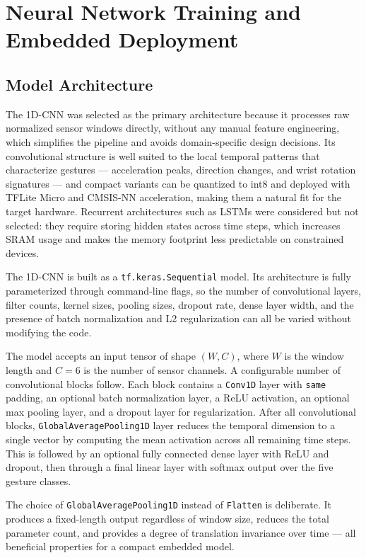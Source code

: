 \section{Neural Network Training and Embedded Deployment}
\label{sec:nn_training}

\subsection{Model Architecture}
\label{sec:architecture}

The 1D-CNN was selected as the primary architecture because it processes raw normalized sensor windows directly, without any manual feature engineering, which simplifies the pipeline and avoids domain-specific design decisions. Its convolutional structure is well suited to the local temporal patterns that characterize gestures — acceleration peaks, direction changes, and wrist rotation signatures — and compact variants can be quantized to int8 and deployed with TFLite Micro and CMSIS-NN acceleration, making them a natural fit for the target hardware. Recurrent architectures such as LSTMs were considered but not selected: they require storing hidden states across time steps, which increases SRAM usage and makes the memory footprint less predictable on constrained devices.

The 1D-CNN is built as a \texttt{tf.keras.Sequential} model. Its architecture is fully parameterized through command-line flags, so the number of convolutional layers, filter counts, kernel sizes, pooling sizes, dropout rate, dense layer width, and the presence of batch normalization and L2 regularization can all be varied without modifying the code. 
 
The model accepts an input tensor of shape $(W, C)$, where $W$ is the window length and $C = 6$ is the number of sensor channels. A configurable number of convolutional blocks follow. Each block contains a \texttt{Conv1D} layer with \texttt{same} padding, an optional batch normalization layer, a ReLU activation, an optional max pooling layer, and a dropout layer for regularization. After all convolutional blocks, \texttt{GlobalAveragePooling1D} layer reduces the temporal dimension to a single vector by computing the mean activation across all remaining time steps. This is followed by an optional fully connected dense layer with ReLU and dropout, then through a final linear layer with softmax output over the five gesture classes.
 
The choice of \texttt{GlobalAveragePooling1D} instead of \texttt{Flatten} is deliberate. It produces a fixed-length output regardless of window size, reduces the total parameter count, and provides a degree of translation invariance over time --- all beneficial properties for a compact embedded model.
 

